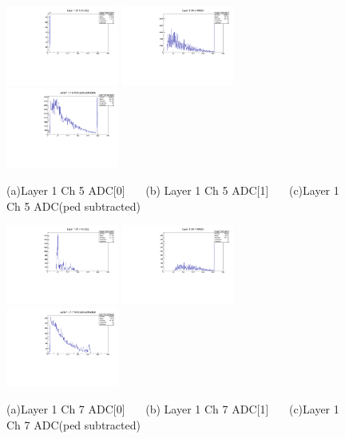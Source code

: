 \documentclass[a4paper,11pt]{article}
\theoremstyle{mytheor}
\begin{document}
\begin{figure}[H] 
\vspace*{-0.3cm} 
\includegraphics[width=0.33\textwidth,scale=0.5,trim=0 0 0 0,clip]{plotsdir/file0_test-Layer1_Ch5_adc0-1.pdf} 
\includegraphics[width=0.33\textwidth,scale=0.5,trim=0 0 0 0,clip]{plotsdir/file0_test-Layer1_Ch5_adc1-1.pdf} 
\includegraphics[width=0.33\textwidth,scale=0.5,trim=0 0 0 0,clip]{plotsdir/file0_test-Layer1_Ch5_adcPedsub-1.pdf} 
\caption{(a)Layer 1 Ch 5 ADC[0] ~~~(b) Layer 1 Ch 5 ADC[1] ~~~(c)Layer 1 Ch 5 ADC(ped subtracted) } 
\end{figure} 
\clearpage 
\begin{figure}[H] 
\vspace*{-0.3cm} 
\includegraphics[width=0.33\textwidth,scale=0.5,trim=0 0 0 0,clip]{plotsdir/file0_test-Layer1_Ch7_adc0-1.pdf} 
\includegraphics[width=0.33\textwidth,scale=0.5,trim=0 0 0 0,clip]{plotsdir/file0_test-Layer1_Ch7_adc1-1.pdf} 
\includegraphics[width=0.33\textwidth,scale=0.5,trim=0 0 0 0,clip]{plotsdir/file0_test-Layer1_Ch7_adcPedsub-1.pdf} 
\caption{(a)Layer 1 Ch 7 ADC[0] ~~~(b) Layer 1 Ch 7 ADC[1] ~~~(c)Layer 1 Ch 7 ADC(ped subtracted) } 
\end{figure} 
\end{document}
